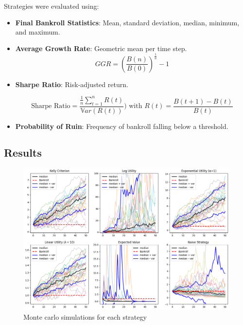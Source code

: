 Strategies were evaluated using:

\begin{itemize}
    \item \textbf{Final Bankroll Statistics}: Mean, standard deviation, median, minimum, and maximum.
    \item \textbf{Average Growth Rate}: Geometric mean per time step. 
    \[GGR = \left( \frac{B(n)}{B(0)} \right)^{\frac{1}{n}} - 1\]

    \item \textbf{Sharpe Ratio}: Risk-adjusted return.

    \[\text{Sharpe Ratio} = \frac{\frac{1}{n} \sum_{t=1}^{n} R(t)}{\mathbb{V}ar(R(t))}) \text{   with   } R(t) = \frac{B(t+1) - B(t)}{B(t)}\]
    
    \item \textbf{Probability of Ruin}: Frequency of bankroll falling below a threshold.
\end{itemize}

\subsection{Results}

\begin{figure}[H]
    \centering
    \includegraphics[width=1.1\textwidth, keepaspectratio]{images/monte_carlo_b=b.png}
    \caption{Monte carlo simulations for each strategy}
    \label{fig:monte_carlo}
\end{figure}


